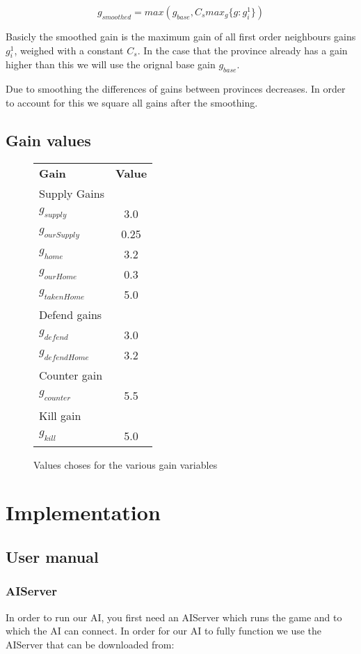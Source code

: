 \documentclass[a4paper]{article} %
\begin{document}
$$g_{smoothed} = max(g_{base}, C_{s} max_{g}\{g : g^1_i\})$$

Basicly the smoothed gain is the maximum gain of all first order neighbours gains $g^1_i$, weighed with a constant $C_s$. In the case that the province already has a gain higher than this we will use the orignal base gain $g_{base}$. 

Due to smoothing the differences of gains between provinces decreases. In order to account for this we square all gains after the smoothing. 



\subsection{Gain values}




\begin{figure}[H]
\centering
\begin{tabular}{| l | c |}
  \hline            
  {\bf Gain} & {\bf Value}\\
  {Supply Gains} &  \\
  $g_{supply}$ & 3.0 \\
  $g_{ourSupply}$ & 0.25 \\
  $g_{home}$ & 3.2 \\
  $g_{ourHome}$ & 0.3 \\
  $g_{takenHome}$ & 5.0 \\
  {Defend gains} &  \\
  $g_{defend}$ &  3.0 \\
  $g_{defendHome}$ & 3.2 \\
  {Counter gain} & \\
  $g_{counter}$ & 5.5 \\
  {Kill gain} & \\
  $g_{kill}$ & 5.0 \\
  \hline  
\end{tabular}
\caption{Values choses for the various gain variables}
\end{figure}


\section{Implementation}
\subsection{User manual}

\subsubsection{AIServer}
In order to run our AI, you first need an AIServer which runs the game and to which the AI can connect. In order for our AI to fully function we use the AIServer that can be downloaded from: 
\end{document}

